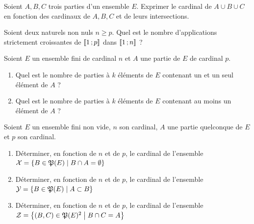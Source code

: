 \begin{exercice}
    Soient \(A, B, C\) trois parties d'un ensemble \(E\). Exprimer le cardinal de \(A \cup B \cup C\) en fonction des cardinaux de \(A, B, C\) et de leurs intersections.
\end{exercice}
\begin{exercice}
    Soient deux naturels non nuls \(n\geqslant p\). Quel est le nombre d'applications strictement croissantes de \(\mathopen{\llbracket}1\mathclose{}\mathpunct{};p\mathclose{\rrbracket}\) dans \(\mathopen{\llbracket}1\mathclose{}\mathpunct{};n\mathclose{\rrbracket}\) ?
\end{exercice}
\begin{exercice}
    Soient \(E\) un ensemble fini de cardinal \(n\) et \(A\) une partie de \(E\) de cardinal \(p\).
    \begin{enumerate}
        \item Quel est le nombre de parties à \(k\) éléments de \(E\) contenant un et un seul élément de \(A\) ?
        \item Quel est le nombre de parties à \(k\) éléments de \(E\) contenant au moins un  élément de \(A\) ?
    \end{enumerate}
\end{exercice}
\begin{exercice}
    Soient \(E\) un ensemble fini non vide, \(n\) son cardinal, \(A\) une partie quelconque de \(E\) et \(p\) son cardinal.
    \begin{enumerate}
        \item Déterminer, en fonction de \(n\) et de \(p\), le cardinal de l'ensemble \(\mathcal{X} = \left\{B \in \mathfrak{P}(E)\mathrel{}\middle|\mathrel{}B \cap A = \emptyset\right\}\)
        \item Déterminer, en fonction de \(n\) et de \(p\), le cardinal de l'ensemble \(\mathcal{Y} = \left\{B \in \mathfrak{P}(E)\mathrel{}\middle|\mathrel{}A \subset B\right\}\)
        \item Déterminer, en fonction de \(n\) et de \(p\), le cardinal de l'ensemble \(\mathcal{Z} = \left\{(B,C) \in \mathfrak{P}(E)^2\mathrel{}\middle|\mathrel{}B \cap C = A\right\}\)
    \end{enumerate}
\end{exercice}
